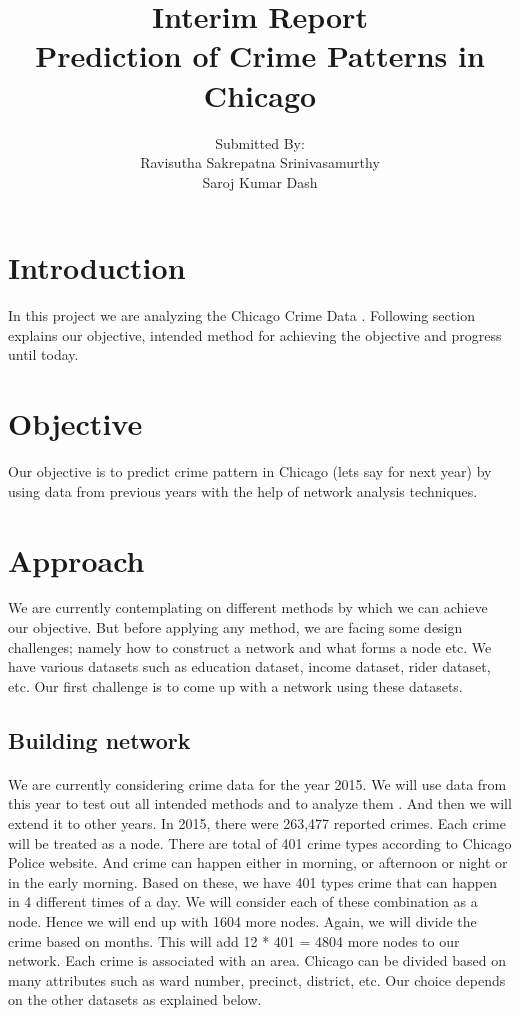 \documentclass{article}
\title{Interim Report\\
Prediction of Crime Patterns in Chicago\vfill{}}
\author{Submitted By:\\Ravisutha Sakrepatna Srinivasamurthy\\
						Saroj Kumar Dash}
\begin{document}
	\begin{titlepage}
		\maketitle
		\end{titlepage}
	
\newpage

\tableofcontents

\newpage	


\section{Introduction}
In this project we are analyzing the Chicago Crime Data \cite{data}. Following section explains our objective, intended method for achieving the objective and progress until today.

\section{Objective}
Our objective is to predict crime pattern in Chicago (lets say for next year) by using data from previous years with the help of network analysis techniques.

\section{Approach}
We are currently contemplating on different methods by which we can achieve our objective. But before applying any method, we are facing some design challenges; namely how to construct a network and what forms a node etc. We have various datasets such as education dataset, income dataset, rider dataset, etc. Our first challenge is to come up with a network using these datasets.

\subsection{Building network}
\paragraph{}
We are currently considering crime data for the year 2015. We will use data from this year to test out all intended methods and to analyze them . And then we will extend it to other years. In 2015, there were 263,477 reported crimes. Each crime will be treated as a node. There are total of 401 crime types  according to Chicago Police website\cite{police}. And crime can happen either in morning, or afternoon or night or in the early morning. Based on these, we have 401 types crime that can happen in 4 different times of a day. We will consider each of these combination as a node. Hence we will end up with 1604 more nodes. Again, we will divide the crime based on months. This will add 12 * 401 = 4804 more nodes to our network. Each crime is associated with an area. Chicago can be divided based on many attributes such as ward number, precinct, district, etc. Our choice depends on the other datasets as explained below.
\end{document}
